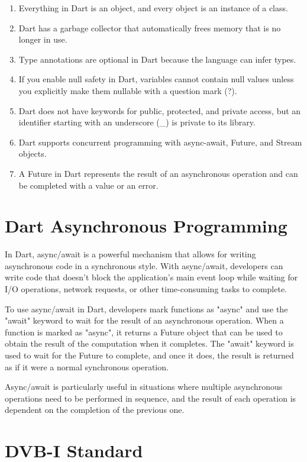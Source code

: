 \documentclass[conference]{IEEEtran}
\begin{document}
\begin{enumerate}
	\item Everything in Dart is an object, and every object is an instance of a class.
	\item Dart has a garbage collector that automatically frees memory that is no longer in use. 
	\item Type annotations are optional in Dart because the language can infer types.
	\item If you enable null safety in Dart, variables cannot contain null values unless you explicitly make them nullable with a question mark (?).
	\item Dart does not have keywords for public, protected, and private access, but an identifier starting with an underscore (\_) is private to its library.
	\item Dart supports concurrent programming with async-await, Future, and Stream objects.
	\item A Future in Dart represents the result of an asynchronous operation and can be completed with a value or an error.
\end{enumerate}

\section{Dart Asynchronous Programming}
In Dart, async/await is a powerful mechanism that allows for writing asynchronous code in a synchronous style. With async/await, developers can write code that doesn't block the application's main event loop while waiting for I/O operations, network requests, or other time-consuming tasks to complete.

To use async/await in Dart, developers mark functions as "async" and use the "await" keyword to wait for the result of an asynchronous operation. When a function is marked as "async", it returns a Future object that can be used to obtain the result of the computation when it completes. The "await" keyword is used to wait for the Future to complete, and once it does, the result is returned as if it were a normal synchronous operation.

Async/await is particularly useful in situations where multiple asynchronous operations need to be performed in sequence, and the result of each operation is dependent on the completion of the previous one. 


\section{DVB-I Standard}
\end{document}

